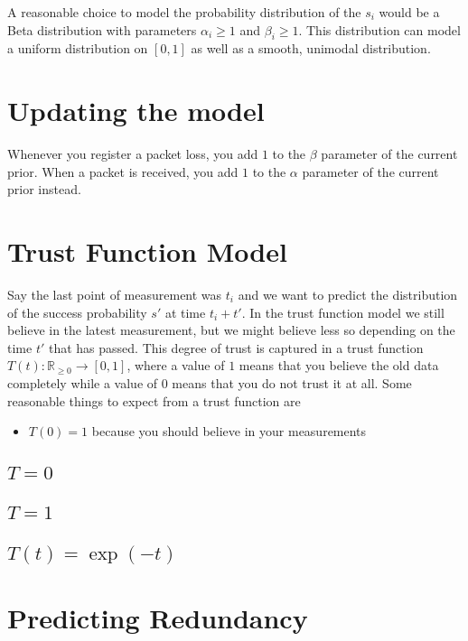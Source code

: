 \documentclass[10pt,a4paper]{article}
\begin{document}
A reasonable choice to model the probability distribution of the $s_{i}$ would be a Beta distribution with parameters $\alpha_{i} \ge 1$ and $\beta_{i} \ge 1$.
This distribution can model a uniform distribution on $[0, 1]$ as well as a smooth, unimodal distribution.

\section{Updating the model}

Whenever you register a packet loss, you add $1$ to the $\beta$ parameter of the current prior.
When a packet is received, you add $1$ to the $\alpha$ parameter of the current prior instead.

\section{Trust Function Model}

Say the last point of measurement was $t_{i}$ and we want to predict the distribution of the success probability $s'$ at time $t_{i} + t'$.
In the trust function model we still believe in the latest measurement, but we might believe less so depending on the time $t'$ that has passed.
This degree of trust is captured in a trust function $T(t) : \mathbb{R}_{\ge 0} \rightarrow [0, 1]$, where a value of $1$ means that you believe the old data completely while a value of $0$ means that you do not trust it at all.
Some reasonable things to expect from a trust function are
\begin{itemize}
\item $T(0) = 1$ because you should believe in your measurements
\end{itemize}

\subsection{$T = 0$}

\subsection{$T = 1$}

\subsection{$T(t) = \exp(-t)$}

\section{Predicting Redundancy}
\end{document}
